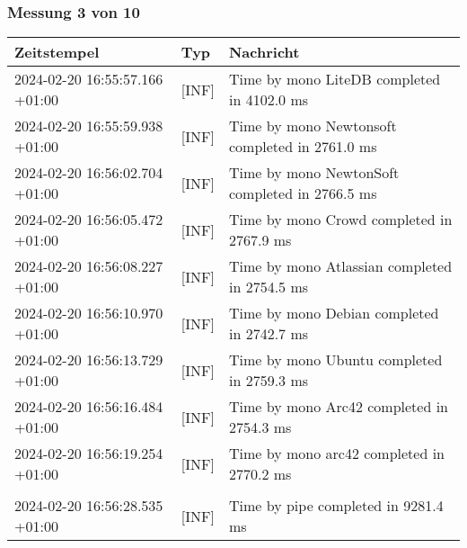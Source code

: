     \subsubsection{Messung 3 von 10} \label{subsubsec:LiteDbWenigerPaketeAlsDb3von10}
        {
            {\small
                \begin{tabularx}{\textwidth}{|l|l|X|}
                    \hline
                    \textbf{Zeitstempel} & \textbf{Typ} & \textbf{Nachricht} \\
                    \hline
                    \endhead
                    2024-02-20 16:55:57.166 +01:00 & [INF] & Time by mono LiteDB completed in 4102.0 ms \\
                    2024-02-20 16:55:59.938 +01:00 & [INF] & Time by mono Newtonsoft completed in 2761.0 ms \\
                    2024-02-20 16:56:02.704 +01:00 & [INF] & Time by mono NewtonSoft completed in 2766.5 ms \\
                    2024-02-20 16:56:05.472 +01:00 & [INF] & Time by mono Crowd completed in 2767.9 ms \\
                    2024-02-20 16:56:08.227 +01:00 & [INF] & Time by mono Atlassian completed in 2754.5 ms \\
                    2024-02-20 16:56:10.970 +01:00 & [INF] & Time by mono Debian completed in 2742.7 ms \\
                    2024-02-20 16:56:13.729 +01:00 & [INF] & Time by mono Ubuntu completed in 2759.3 ms \\
                    2024-02-20 16:56:16.484 +01:00 & [INF] & Time by mono Arc42 completed in 2754.3 ms \\
                    2024-02-20 16:56:19.254 +01:00 & [INF] & Time by mono arc42 completed in 2770.2 ms \\
                    & & \\
                    2024-02-20 16:56:28.535 +01:00 & [INF] & Time by pipe completed in 9281.4 ms \\
                    \hline
                \end{tabularx}
            }
        }

